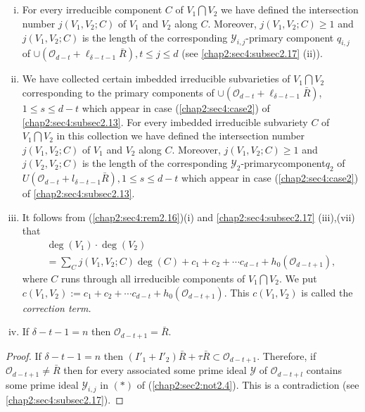 \subsection{}\label{chap2:sec4:subsec2.18}
\begin{enumerate}[(i)]
\item For every irreducible component $C $ of $V_1 \bigcap V_2$ we
  have defined the intersection number $j(V_1,V_2;C)$ of $V_1$ and
  $V_2$ along $C$. Moreover, $j (V_1, V_2; C) \geq 1$ and
  $j(V_1, V_2; C)$ is the length of the corresponding $\mathscr{Y}_{i,
    j}$-primary component $q_{i, j}$ of
  $\cup(\mathscr{O}_{d-t}+\ell_{\delta-t-1} \bar{R}),t \leq j\leq d$ (see
  \ref{chap2:sec4:subsec2.17} (ii)). 
\item We have collected certain imbedded irreducible subvarieties of
  $V_1 \bigcap V_2$ corresponding to the primary components of
  $\cup(\mathscr{O}_{d-t}+\ell_{\delta-t-1} \bar{R})$, $1 \leq s\leq d-t$
  which appear in case (\ref{chap2:sec4:case2}) of
  \ref{chap2:sec4:subsec2.13}. For every imbedded irreducible 
  subvariety $C$ of $V_1 \bigcap V_2$ in this collection we have
  defined the intersection number $j(V_1, V_2;C)$ of $V_1$ and $V_2$
  along $C$. Moreover, $j(V_1,V_2;C)\geq 1$ and $j(V_2,V_2;C)$ is the
  length of the corresponding $\mathscr{Y}_2$-primary\pageoriginale component$q_2$ of
  $U(\mathscr{O}_{d-t}+l_{\delta-t-1} \bar{R}),1\leq s \leq d-t$ which
  appear in case (\ref{chap2:sec4:case2}) of \ref{chap2:sec4:subsec2.13}. 
\item It follows from (\ref{chap2:sec4:rem2.16})(i) and
  \ref{chap2:sec4:subsec2.17} (iii),(vii) that
  \begin{multline*}
  \deg (V_1)\cdot \deg (V_2)\\
  = \sum \limits_{C} j(V_1,V_2;C)\deg
  (C)+c_1+c_2+ \cdots c_{d-t}+h_0 (\mathscr{O}_{d-t+1}), 
  \end{multline*}
  where $C$
  runs through all irreducible components of $V_1 \bigcap V_2$. We put
  $c(V_1,V_2):=c_1+c_2+ \cdots c_{d-t}+h_0(\mathscr{O}_{d-t+1})$. This
  $c(V_1,V_2)$ is called the \textit{correction term.} 

\item If $\delta-t-1=n$ then $\mathscr{O}_{d-t+1}=\bar{R}$.
\end{enumerate}  

\begin{proof}
  If $\delta-t-1=n$ then $(I'_1+I'_2)\bar{R}+ \tau \bar{R}\subset
  \mathscr{O}_{d-t+1}$. Therefore, if $\mathscr{O}_{d-t+1}\neq
  \bar{R}$ then for every associated some prime ideal $\mathscr{Y}$ of
  $\mathscr{O}_{d-t+l}$ contains some prime ideal 
  $\mathscr{Y}_{i, j}$ in $(*)$ of (\ref{chap2:sec2:not2.4}). This is
  a contradiction (see \ref{chap2:sec4:subsec2.17}).  
\end{proof}  
 
